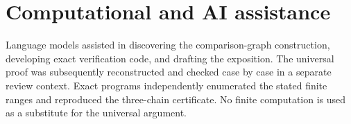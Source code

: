 \documentclass[11pt]{article}
\begin{document}
\section*{Computational and AI assistance}

Language models assisted in discovering the comparison-graph construction,
developing exact verification code, and drafting the exposition.  The
universal proof was subsequently reconstructed and checked case by case in a
separate review context.  Exact programs independently enumerated the stated
finite ranges and reproduced the three-chain certificate.  No finite
computation is used as a substitute for the universal argument.



\end{document}
